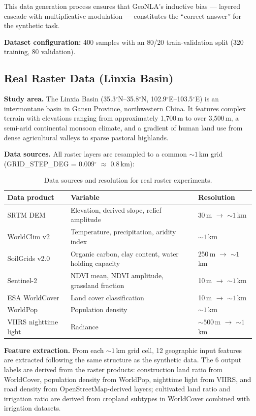 \documentclass[a4paper,11pt]{article}
\begin{document}
This data generation process ensures that GeoNLA's inductive bias --- layered cascade with multiplicative modulation --- constitutes the ``correct answer'' for the synthetic task.

\textbf{Dataset configuration:} 400 samples with an 80/20 train-validation split (320 training, 80 validation).

\subsection{Real Raster Data (Linxia Basin)}
\label{subsec:real_data}

\textbf{Study area.} The Linxia Basin (35.3$^{\circ}$N--35.8$^{\circ}$N, 102.9$^{\circ}$E--103.5$^{\circ}$E) is an intermontane basin in Gansu Province, northwestern China. It features complex terrain with elevations ranging from approximately 1,700\,m to over 3,500\,m, a semi-arid continental monsoon climate, and a gradient of human land use from dense agricultural valleys to sparse pastoral highlands.

\textbf{Data sources.} All raster layers are resampled to a common ${\sim}1$\,km grid (GRID\_STEP\_DEG = 0.009$^{\circ}$ $\approx$ 0.8\,km):

\begin{table}[htbp]
\centering
\caption{Data sources and resolution for real raster experiments.}
\label{tab:data_sources}
\begin{tabular}{lll}
\toprule
Data product & Variable & Resolution \\
\midrule
SRTM DEM & Elevation, derived slope, relief amplitude & 30\,m $\to$ ${\sim}1$\,km \\
WorldClim v2 & Temperature, precipitation, aridity index & ${\sim}1$\,km \\
SoilGrids v2.0 & Organic carbon, clay content, water holding capacity & 250\,m $\to$ ${\sim}1$\,km \\
Sentinel-2 & NDVI mean, NDVI amplitude, grassland fraction & 10\,m $\to$ ${\sim}1$\,km \\
ESA WorldCover & Land cover classification & 10\,m $\to$ ${\sim}1$\,km \\
WorldPop & Population density & ${\sim}1$\,km \\
VIIRS nighttime light & Radiance & ${\sim}500$\,m $\to$ ${\sim}1$\,km \\
\bottomrule
\end{tabular}
\end{table}

\textbf{Feature extraction.} From each ${\sim}1$\,km grid cell, 12 geographic input features are extracted following the same structure as the synthetic data. The 6 output labels are derived from the raster products: construction land ratio from WorldCover, population density from WorldPop, nighttime light from VIIRS, and road density from OpenStreetMap-derived layers; cultivated land ratio and irrigation ratio are derived from cropland subtypes in WorldCover combined with irrigation datasets.
\end{document}

